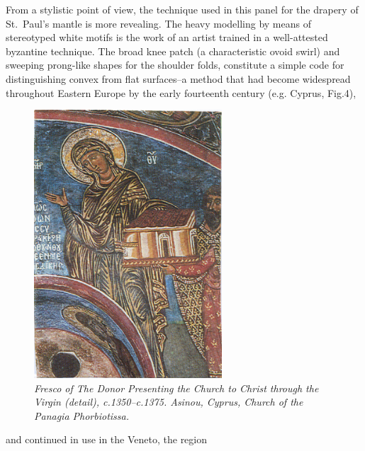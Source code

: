 \documentclass[a4paper,12pt]{article}
\begin{document}
From a stylistic point of view, the technique used in this panel for
the drapery of St.~Paul's mantle is more revealing.  The heavy
modelling by means of stereotyped white motifs is the work of an
artist trained in a well-attested byzantine technique. The broad knee
patch (a characteristic ovoid swirl) and sweeping prong-like shapes
for the shoulder folds, constitute a simple code for distinguishing
convex from flat surfaces--a method that had become widespread
throughout Eastern Europe by the early fourteenth century
(e.g. Cyprus, Fig.4),
\begin{figure}[htbp]
\centering
\includegraphics[width=7cm]{pics/fig4.png}
\caption[Fresco of The Donor Presenting the Church to Christ
  through the Virgin (detail)]
{\it Fresco of The Donor Presenting the Church to Christ
  through the Virgin (detail), c.1350--c.1375.  Asinou, Cyprus,
  Church of the Panagia Phorbiotissa.}
\end{figure}
and continued in use in the Veneto, the region
\end{document}
